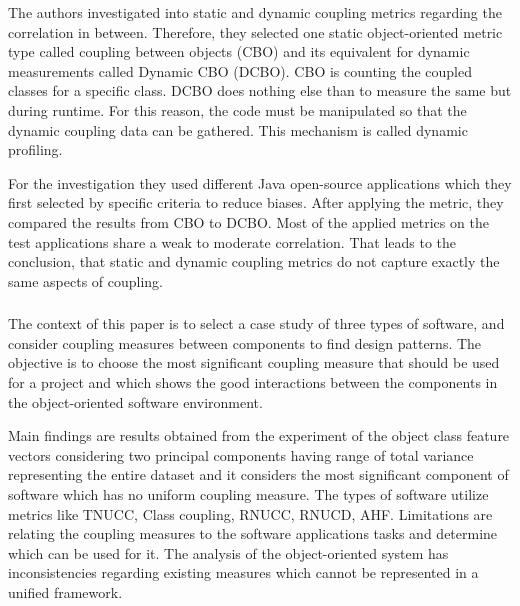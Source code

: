         The authors investigated into static and dynamic coupling metrics regarding the correlation in between. Therefore, they selected one static object-oriented metric type called coupling between objects (CBO) and its equivalent for dynamic measurements called Dynamic CBO (DCBO). CBO is counting the coupled classes for a specific class. DCBO does nothing else than to measure the same but during runtime. For this reason, the code must be manipulated so that the dynamic coupling data can be gathered. This mechanism is called dynamic profiling.
        
        For the investigation they used different Java open-source applications which they first selected by specific criteria to reduce biases. After applying the metric, they compared the results from CBO to DCBO. Most of the applied metrics on the test applications share a weak to moderate correlation. That leads to the conclusion, that static and dynamic coupling metrics do not capture exactly the same aspects of coupling.

    \subsubsection{ \cite{s23_coupling}}
    
        The context of this paper is to select a case study of three types of software, and consider coupling measures between components to find design patterns. The objective is to choose the most significant coupling measure that should be used for a project and which shows the good interactions between the components in the object-oriented software environment. 
        
        Main findings are results obtained from the experiment of the object class feature vectors considering two principal components having range of total variance representing the entire dataset and it considers the most significant component of software which has no uniform coupling measure. The types of software utilize metrics like TNUCC, Class coupling, RNUCC, RNUCD, AHF. Limitations are relating the coupling measures to the software applications tasks and determine which can be used for it. The analysis of the object-oriented system has inconsistencies regarding existing measures which cannot be represented in a unified framework.
    
    \subsubsection{ \cite{s89_coupling}}
    
